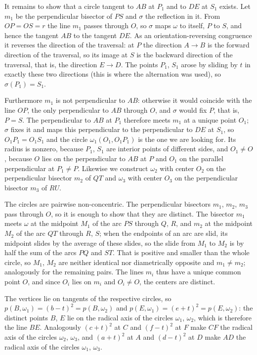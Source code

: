 {    It remains to show that a circle tangent to $AB$ at $P_1$ and to $DE$ at $S_1$ exists. Let $m_1$ be the perpendicular bisector of $PS$ and $\sigma$ the reflection in it. From $OP = OS = r$ the line $m_1$ passes through $O$, so $\sigma$ maps $\omega$ to itself, $P$ to $S$, and hence the tangent $AB$ to the tangent $DE$. As an orientation-reversing congruence it reverses the direction of the traversal: at $P$ the direction $A \to B$ is the forward direction of the traversal, so its image at $S$ is the backward direction of the traversal, that is, the direction $E \to D$. The points $P_1$, $S_1$ arose by sliding by $t$ in exactly these two directions (this is where the alternation was used), so $\sigma(P_1) = S_1$.

    Furthermore $m_1$ is not perpendicular to $AB$: otherwise it would coincide with the line $OP$, the only perpendicular to $AB$ through $O$, and $\sigma$ would fix $P$, that is, $P = S$. The perpendicular to $AB$ at $P_1$ therefore meets $m_1$ at a unique point $O_1$; $\sigma$ fixes it and maps this perpendicular to the perpendicular to $DE$ at $S_1$, so $O_1P_1 = O_1S_1$ and the circle $\omega_1(O_1,O_1P_1)$ is the one we are looking for. Its radius is nonzero, because $P_1$, $S_1$ are interior points of different sides, and $O_1 \neq O$, because $O$ lies on the perpendicular to $AB$ at $P$ and $O_1$ on the parallel perpendicular at $P_1 \neq P$. Likewise we construct $\omega_2$ with center $O_2$ on the perpendicular bisector $m_2$ of $QT$ and $\omega_3$ with center $O_3$ on the perpendicular bisector $m_3$ of $RU$.

    The circles are pairwise non-concentric. The perpendicular bisectors $m_1$, $m_2$, $m_3$ pass through $O$, so it is enough to show that they are distinct. The bisector $m_1$ meets $\omega$ at the midpoint $M_1$ of the arc $PS$ through $Q$, $R$, and $m_2$ at the midpoint $M_2$ of the arc $QT$ through $R$, $S$; when the endpoints of an arc are slid, its midpoint slides by the average of these slides, so the slide from $M_1$ to $M_2$ is by half the sum of the arcs $PQ$ and $ST$. That is positive and smaller than the whole circle, so $M_1$, $M_2$ are neither identical nor diametrically opposite and $m_1 \neq m_2$; analogously for the remaining pairs. The lines $m_i$ thus have a unique common point $O$, and since $O_i$ lies on $m_i$ and $O_i \neq O$, the centers are distinct.

    The vertices lie on tangents of the respective circles, so $p(B,\omega_1) = (b-t)^2 = p(B,\omega_2)$ and $p(E,\omega_1) = (e+t)^2 = p(E,\omega_2)$: the distinct points $B$, $E$ lie on the radical axis of the circles $\omega_1$, $\omega_2$, which is therefore the line $BE$. Analogously $(c+t)^2$ at $C$ and $(f-t)^2$ at $F$ make $CF$ the radical axis of the circles $\omega_2$, $\omega_3$, and $(a+t)^2$ at $A$ and $(d-t)^2$ at $D$ make $AD$ the radical axis of the circles $\omega_1$, $\omega_3$.

}
